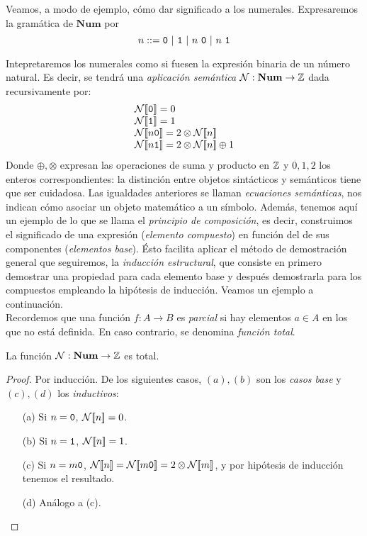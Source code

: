 Veamos, a modo de ejemplo, cómo dar significado a los numerales. Expresaremos la gramática de $\mathbf{Num}$ por
\[
    n ::= \n{0}\ |\ \n{1} \ |\ n\ \n{0} \ |\ n\ \n{1}
\]

Intepretaremos los numerales como si fuesen la expresión binaria de un número natural. Es decir, se tendrá una \textit{aplicación semántica} $\mathcal{N}: \mathbf{Num} \to \mathbb{Z}$ dada recursivamente por:
\[
    \begin{array}{l}
         \fc{\mc{N}}{\n{0}} = 0 \\
         \fc{\mc{N}}{\n{1}}= 1 \\
         \fc{\mc{N}}{n \n{0}} = 2\otimes \fc{\mc{N}}{n}\\
         \fc{\mc{N}}{n \n{1}} = 2\otimes \fc{\mc{N}}{n} \oplus 1
    \end{array}
\]
Donde $\oplus, \otimes$ expresan las operaciones de suma y producto en $\mathbb{Z}$ y $0, 1, 2$ los enteros correspondientes: la distinción entre objetos sintácticos y semánticos tiene que ser cuidadosa. Las igualdades anteriores se llaman \textit{ecuaciones semánticas}, nos indican cómo asociar un objeto matemático a un símbolo. Además, tenemos aquí un ejemplo de lo que se llama el \textit{principio de composición}, es decir, construimos el significado de una expresión (\textit{elemento compuesto}) en función del de sus componentes (\textit{elementos base}). Ésto facilita aplicar el método de demostración general que seguiremos, la \textit{inducción estructural}, que consiste en primero demostrar una propiedad para cada elemento base y después demostrarla para los compuestos empleando la hipótesis de inducción. Veamos un ejemplo a continuación.
\\

Recordemos que una función $f: A \rightarrow B$ es \textit{parcial} si hay elementos $a\in A$ en los que no está definida. En caso contrario, se denomina \textit{función total}.

\begin{prop}
La función $\mathcal{N}: \mathbf{Num} \to \mathbb{Z}$ es total.
\end{prop}
\begin{proof}
Por inducción. De los siguientes casos, $(a), (b)$ son los \textit{casos base} y $(c), (d)$ los \textit{inductivos}:
\begin{itemize}
    \item[(a)] Si $n = \texttt{0}$, $\mathcal{N}[\![n]\!] = 0$.
    \item[(b)] Si $n = \texttt{1}$, $\mathcal{N}[\![n]\!] = 1$.
    \item[(c)] Si $n = m\texttt{0}$, $\mathcal{N}[\![n]\!] = \mathcal{N}[\![m\texttt{0}]\!] = 2 \otimes \mathcal{N}[\![m]\!]$, y por hipótesis de inducción tenemos el resultado.
    \item[(d)] Análogo a (c).
\end{itemize}
\end{proof}

